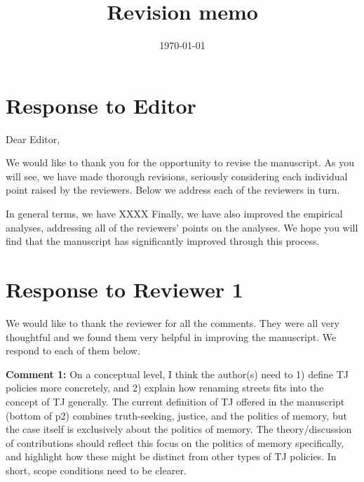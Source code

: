 \documentclass[12pt, a4paper, notitlepage]{article}
\title{\Large \textbf{Revision memo}\\\vspace{10pt}{\large `Do TJ policies cause backlash? Evidence from street name changes in Spain', submitted to Research \& Politics (Manuscript ID RAP-21-0006)}}
\author{}
\date{\large \today}
\begin{document}
\maketitle

\section*{Response to Editor}

Dear Editor,

We would like to thank you for the opportunity to revise the manuscript. As you will see, we have made thorough revisions, seriously considering each individual point raised by the reviewers. Below we address each of the reviewers in turn.

In general terms, we have  XXXX
Finally, we have also improved the empirical analyses, addressing all of the reviewers' points on the analyses. We hope you will find that the manuscript has significantly improved through this process.\\ [1ex]

\bigspace

\newpage

\section*{Response to Reviewer 1}

We would like to thank the reviewer for all the comments. They were all very thoughtful and we found them very helpful in improving the manuscript. We respond to each of them below.

\textbf{Comment 1:} On a conceptual level, I think the author(s) need to 1) define TJ policies more concretely, and 2) explain how renaming streets fits into the concept of TJ generally. The current definition of TJ offered in the manuscript (bottom of p2) combines truth-seeking, justice, and the politics of memory, but the case itself is exclusively about the politics of memory. The theory/discussion of contributions should reflect this focus on the politics of memory specifically, and highlight how these might be distinct from other types of TJ policies. In short, scope conditions need to be clearer.
\end{document}
